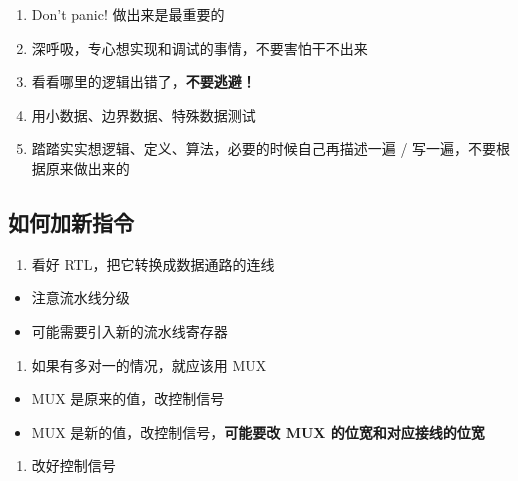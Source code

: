 \documentclass[12pt,AutoFakeBold,AutoFakeSlant]{article}
\providecommand{\tightlist}{%
  \setlength{\itemsep}{0pt}\setlength{\parskip}{0pt}}
\begin{document}
\begin{enumerate}
\def\labelenumi{\arabic{enumi}.}
\tightlist
\item
  Don't panic! 做出来是最重要的
\item
  深呼吸，专心想实现和调试的事情，不要害怕干不出来
\item
  看看哪里的逻辑出错了，\textbf{不要逃避！}
\item
  用小数据、边界数据、特殊数据测试
\item
  踏踏实实想逻辑、定义、算法，必要的时候自己再描述一遍 /
  写一遍，不要根据原来做出来的
\end{enumerate}

\hypertarget{ux5982ux4f55ux52a0ux65b0ux6307ux4ee4}{%
\subsection{如何加新指令}\label{ux5982ux4f55ux52a0ux65b0ux6307ux4ee4}}

\begin{enumerate}
\def\labelenumi{\arabic{enumi}.}
\tightlist
\item
  看好 RTL，把它转换成数据通路的连线
\end{enumerate}

\begin{itemize}
\tightlist
\item
  注意流水线分级
\item
  可能需要引入新的流水线寄存器
\end{itemize}

\begin{enumerate}
\def\labelenumi{\arabic{enumi}.}
\setcounter{enumi}{1}
\tightlist
\item
  如果有多对一的情况，就应该用 MUX
\end{enumerate}

\begin{itemize}
\tightlist
\item
  MUX 是原来的值，改控制信号
\item
  MUX 是新的值，改控制信号，\textbf{可能要改 MUX 的位宽和对应接线的位宽}
\end{itemize}

\begin{enumerate}
\def\labelenumi{\arabic{enumi}.}
\setcounter{enumi}{2}
\tightlist
\item
  改好控制信号
\end{enumerate}
\end{document}
